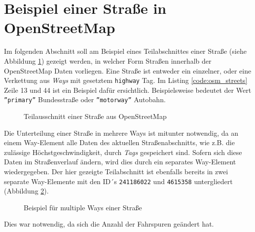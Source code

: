\section{Beispiel einer Straße in OpenStreetMap}
\label{sec:appenix:osm:streets}
Im folgenden Abschnitt soll am Beispiel eines Teilabschnittes einer Straße (siehe Abbildung \ref{fig:osm_streets_1}) gezeigt werden, in welcher Form Straßen innerhalb der OpenStreetMap Daten vorliegen.
Eine Straße ist entweder ein einzelner, oder eine Verkettung aus \textit{Ways} mit gesetztem \texttt{highway} Tag.
Im Listing \ref{code:osm_streets} Zeile 13 und 44 ist ein Beispiel dafür ersichtlich. Beispielsweise bedeutet der Wert \texttt{''primary''} Bundesstraße oder \texttt{''motorway''} Autobahn.
\begin{figure}[htb]
  \centering
   \caption{Teilausschnitt einer Straße aus OpenStreetMap}
   \label{fig:osm_streets_1}
\end{figure}
Die Unterteilung einer Straße in mehrere Ways ist mitunter notwendig, da an einem Way-Element alle Daten des aktuellen Straßenabschnitts, wie z.B. die zulässige Höchstgeschwindigkeit, durch \textit{Tags} gespeichert sind.
Sofern sich diese Daten im Straßenverlauf ändern, wird dies durch ein separates Way-Element wiedergegeben.
Der hier gezeigte Teilabschnitt ist ebenfalls bereits in zwei separate Way-Elemente mit den ID´s \texttt{241186022} und \texttt{4615358} untergliedert (Abbildung \ref{fig:osm_streets_2}).
\begin{figure}[htb]
  \centering
   \caption{Beispiel für multiple Ways einer Straße}
   \label{fig:osm_streets_2}
\end{figure}
Dies war notwendig, da sich die Anzahl der Fahrspuren geändert hat.
